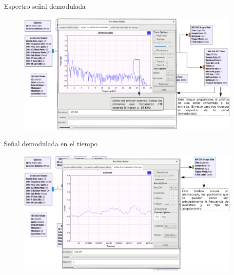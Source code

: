 \begin{frame}{Espectro señal demodulada}

\begin{figure}[H]
\centering
\vspace{-3mm}
\includegraphics[width=\textwidth]{parte3/lab8/pdf/lab8_10.pdf}
\end{figure}

\end{frame}


\begin{frame}{Señal demodulada en el tiempo}

\begin{figure}[H]
\centering
\vspace{-3mm}
\includegraphics[width=\textwidth]{parte3/lab8/pdf/lab8_11.pdf}
\end{figure}

\end{frame}

